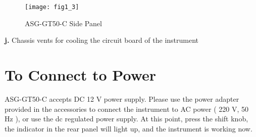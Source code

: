 \begin{figure}[ht]
\centering
\texttt{[image: fig1\_3]}
\caption{\hspace{0.3cm}ASG-GT50-C Side Panel}\label{fig:fig1_3}
\end{figure}
\noindent \textbf{j.} Chassis vents for cooling the circuit board of the instrument

\section{\heiti To Connect to Power}
ASG-GT50-C accepts DC 12 V power supply. Please use the power adapter provided in the accessories to connect the instrument to AC power ( 220 V, 50 Hz ), or use the dc regulated power supply. At this point, press the shift knob, the indicator in the rear panel will light up, and the instrument is working now.

